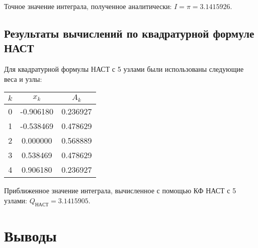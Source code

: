 \documentclass[12pt,a4paper]{article}
\begin{document}
Точное значение интеграла, полученное аналитически: $I = {\pi} = 3.1415926$.

\subsection{Результаты вычислений по квадратурной формуле НАСТ}

Для квадратурной формулы НАСТ с 5 узлами были использованы следующие веса и узлы:

\begin{table}[H]
\centering
\begin{tabular}{|c|c|c|}
\hline
$k$ & $x_k$ & $A_k$ \\
\hline
0 & -0.906180 & 0.236927 \\
\hline
1 & -0.538469 & 0.478629 \\
\hline
2 & 0.000000 & 0.568889 \\
\hline
3 & 0.538469 & 0.478629 \\
\hline
4 & 0.906180 & 0.236927 \\
\hline
\end{tabular}
\end{table}

Приближенное значение интеграла, вычисленное с помощью КФ НАСТ с 5 узлами: $Q_{НАСТ} = 3.1415905$.

\section{Выводы}
\end{document}
